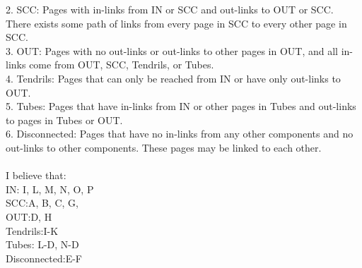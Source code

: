 \documentclass[10pt,letterpaper]{article}
\begin{document}
    2. SCC: Pages with in-links from IN or SCC and out-links to OUT or SCC. There exists some path of links from every page in SCC to every other page in SCC.\\
    3. OUT: Pages with no out-links or out-links to other pages in OUT, and all in-links come from OUT, SCC, Tendrils, or Tubes.\\ 
    4. Tendrils: Pages that can only be reached from IN or have only out-links to OUT. \\
    5. Tubes: Pages that have in-links from IN or other pages in Tubes and out-links to pages in Tubes or OUT.\\ 
    6. Disconnected: Pages that have no in-links from any other components and no out-links to other components. These pages may be linked to each other.\\
\cite{broder_2003}
\\
I believe that:\\
    IN: I, L, M, N, O, P\\ 
    SCC:A, B, C, G, \\ 
    OUT:D, H \\ 
    Tendrils:I-K\\
    Tubes: L-D, N-D \\ 
    Disconnected:E-F\\ 

\pagebreak%



\end{document}
